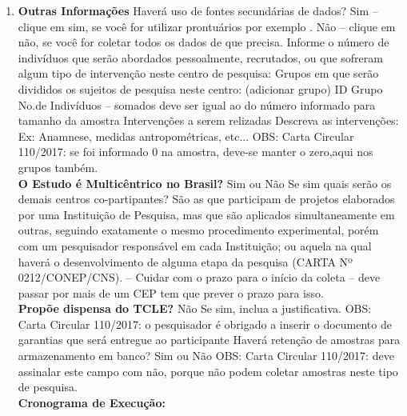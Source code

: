 \documentclass[10pt,a4paper]{article}
\begin{document}
\begin{enumerate}
\item \textbf{Outras Informações}
Haverá uso de fontes secundárias de dados?
Sim – clique em sim, se você for utilizar prontuários por exemplo .
Não – clique em não, se você for coletar todos os dados de que precisa.
Informe o número de indivíduos que serão abordados pessoalmente, recrutados, ou que sofreram algum tipo de intervenção
neste centro de pesquisa:
Grupos em que serão divididos os sujeitos de pesquisa neste centro: (adicionar grupo)
ID Grupo
No.de Indivíduos – somados deve ser igual
ao do número informado para tamanho da
amostra
Intervenções a serem relizadas
Descreva as intervenções: Ex: Anamnese,
medidas antropométricas, etc...
OBS: Carta Circular 110/2017: se foi informado 0 na amostra, deve-se manter o zero,aqui nos grupos também.
\\ \textbf{O Estudo é Multicêntrico no Brasil?}
Sim ou Não
Se sim quais serão os demais centros co-partipantes?
São as que participam de projetos elaborados por uma Instituição de Pesquisa, mas que são aplicados simultaneamente em outras,
seguindo exatamente o mesmo procedimento experimental, porém com um pesquisador responsável em cada Instituição; ou
aquela na qual haverá o desenvolvimento de alguma etapa da pesquisa (CARTA Nº 0212/CONEP/CNS). – Cuidar com o prazo para o
início da coleta – deve passar por mais de um CEP tem que prever o prazo para isso.
\\ \textbf{Propõe dispensa do TCLE?}
Não
Se sim, inclua a justificativa.
OBS: Carta Circular 110/2017: o pesquisador é obrigado a inserir o documento de garantias que será entregue ao participante
Haverá retenção de amostras para armazenamento em banco?
Sim ou Não
OBS: Carta Circular 110/2017: deve assinalar este campo com não, porque não podem coletar amostras neste tipo de pesquisa.
\\ \textbf{Cronograma de Execução:} \\%
\end{enumerate}
\end{document}
